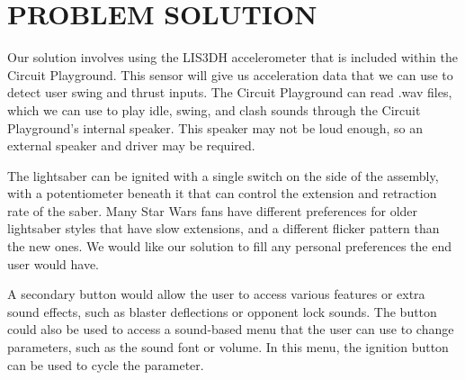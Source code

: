 \documentclass[12pt]{article}
\begin{document}



\section{PROBLEM SOLUTION}

Our solution involves using the LIS3DH accelerometer that is included within the Circuit Playground. This sensor will give us acceleration data that we can use to detect user swing and thrust inputs. The Circuit Playground can read .wav files, which we can use to play idle, swing, and clash sounds through the Circuit Playground's internal speaker. This speaker may not be loud enough, so an external speaker and driver may be required. 

The lightsaber can be ignited with a single switch on the side of the assembly, with a potentiometer beneath it that can control the extension and retraction rate of the saber. Many Star Wars fans have different preferences for older lightsaber styles that have slow extensions, and a different flicker pattern than the new ones. We would like our solution to fill any personal preferences the end user would have. 

A secondary button would allow the user to access various features or extra sound effects, such as blaster deflections or opponent lock sounds. The button could also be used to access a sound-based menu that the user can use to change parameters, such as the sound font or volume. In this menu, the ignition button can be used to cycle the parameter. 
\end{document}

